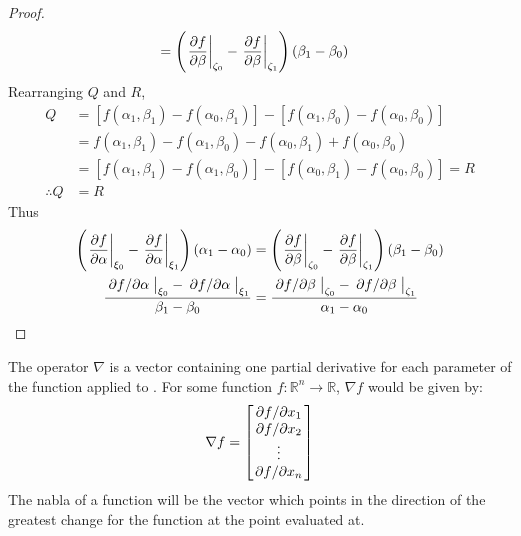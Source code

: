 \begin{lemma}
\begin{proof}
\begin{align*}
			&=\left(\eval{\pdv{f}{\beta}}_{\zeta_0}-\eval{\pdv{f}{\beta}}_{\zeta_1}\right)\left(\beta_1-\beta_0\right)
		\end{align*}
		Rearranging $Q$ and $R$,
		\begin{align*}
			Q&=[f(\alpha_1,\beta_1)-f(\alpha_0,\beta_1)]-[f(\alpha_1,\beta_0)-f(\alpha_0,\beta_0)]\\
			&=f(\alpha_1,\beta_1)-f(\alpha_1,\beta_0)-f(\alpha_0,\beta_1)+f(\alpha_0,\beta_0)\\
			&=[f(\alpha_1,\beta_1)-f(\alpha_1,\beta_0)]-[f(\alpha_0,\beta_1)-f(\alpha_0,\beta_0)]=R\\
			\therefore Q&=R
		\end{align*}
		Thus
		\begin{align*}
			\left(\eval{\pdv{f}{\alpha}}_{\xi_0}-\eval{\pdv{f}{\alpha}}_{\xi_1}\right)\left(\alpha_1-\alpha_0\right)&=\left(\eval{\pdv{f}{\beta}}_{\zeta_0}-\eval{\pdv{f}{\beta}}_{\zeta_1}\right)\left(\beta_1-\beta_0\right)\\
			\frac{\eval{\pdv*{f}{\alpha}}_{\xi_0}-\eval{\pdv*{f}{\alpha}}_{\xi_1}}{\beta_1-\beta_0}&=\frac{\eval{\pdv*{f}{\beta}}_{\zeta_0}-\eval{\pdv*{f}{\beta}}_{\zeta_1}}{\alpha_1-\alpha_0}
		\end{align*}
	\end{proof}
\end{lemma}
\begin{defn}
	The  operator $\nabla$ is a vector containing one partial derivative for each parameter of
	the function applied to \cite{RAPP2017137}. For some function $f:\mathbb{R}^n\rightarrow\mathbb{R}$, $\nabla f$ would be given by:
	$$
	\nabla f=\begin{bmatrix}
		\pdv*{f}{x_1}\\
		\pdv*{f}{x_2}\\
		\vdots\\
		\pdv*{f}{x_n}
	\end{bmatrix}
	$$
	The nabla of a function will be the vector which points in the direction of the greatest change for the function
	at the point evaluated at.
\end{defn}

